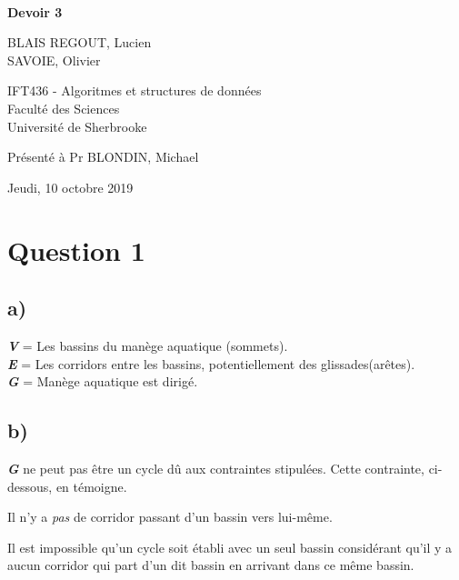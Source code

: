 \documentclass[11pt,a4paper, oneside, oldfontcommands]{memoir}
\begin{document}
\thispagestyle{empty}

{%
\sffamily
\centering
\Large

~\vspace{\fill}

{\huge 
\textbf{Devoir 3}
}

\vspace{2.5cm}

{
BLAIS REGOUT, Lucien\\
SAVOIE, Olivier
}

\vspace{3.5cm}

IFT436 - Algoritmes et structures de données\\[1em]

Faculté des Sciences\\
Université de Sherbrooke

\vspace{3.5cm}

Présenté à Pr BLONDIN, Michael

\vspace{\fill}

Jeudi, 10 octobre 2019

}%
\chapter{Question 1}
\section{a)}
  \noindent
  \textbf{\textit{V}} = Les bassins du manège aquatique (sommets).\\[1em]
  \textbf{\textit{E}} = Les corridors entre les bassins, potentiellement des glissades(arêtes).\\[1em]
  \textbf{\textit{G}} = Manège aquatique est dirigé.


\section{b)}
  \textbf{\textit{G}} ne peut pas être un cycle dû aux contraintes stipulées. Cette contrainte, ci-dessous, en témoigne.\\

  \begin{siderules}
    Il n'y a \textit{pas} de corridor passant d'un bassin vers lui-même.
  \end{siderules}
  
  \noindent
  Il est impossible qu'un cycle soit établi avec un seul bassin considérant qu'il y a aucun corridor qui part d'un dit bassin en arrivant dans ce même bassin.\\[1em]
  
\end{document}

